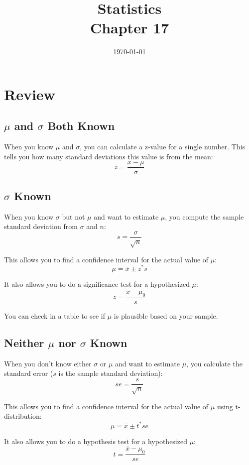 \documentclass[letterpaper, landscape]{exam}
\title{Statistics \\ Chapter 17}
\date{\today}
\author{}
\begin{document}
  \maketitle
  \setcounter{tocdepth}{2}
  \tableofcontents

  \section{Review} %
  
  \subsection{$\mu$ and $\sigma$ Both Known} %
  
  When you know $\mu$ and $\sigma$, you can calculate a z-value for a single
  number. This tells you how many standard deviations this value is from the
  mean:
  \[
    z = \frac{x - \mu}{\sigma}
  \]

  \subsection{$\sigma$ Known} %

  When you know $\sigma$ but not $\mu$ and want to estimate $\mu$, you 
  compute the sample standard deviation from $\sigma$ and $n$:
  \[
    s = \frac{\sigma}{\sqrt{n}}
  \]

  This allows you to find a confidence interval for the actual value of
  $\mu$:
  \[
    \mu = \bar{x} \pm z^* s
  \]

  It also allows you to do a significance test for a hypothesized $\mu$:
  \[
    z = \frac{\bar{x} - \mu_0}{s}
  \]

  You can check in a table to see if $\mu$ is plausible based on your sample.

  \subsection{Neither $\mu$ nor $\sigma$ Known} %

  When you don't know either $\sigma$ or $\mu$ and want to estimate $\mu$, you calculate the
  standard error ($s$ is the sample standard deviation):
  \[
    se = \frac{s}{\sqrt{n}}
  \]

  This allows you to find a confidence interval for the actual value of
  $\mu$ using t-distribution:
  \[
    \mu = \bar{x} \pm t^* se
  \]

  It also allows you to do a hypothesis test for a hypothesized $\mu$:
  \[
    t = \frac{\bar{x} - \mu_0}{se}
  \]
\end{document}

